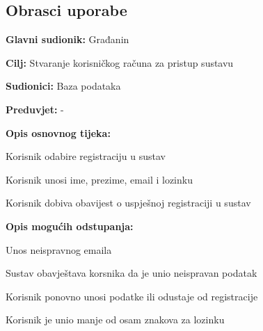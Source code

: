 			\eject 
			
			
				
			\subsection{Obrasci uporabe}
				
			
					

					\noindent {}
					\begin{packed_item}
	
						\item \textbf{Glavni sudionik: } Građanin
						\item  \textbf{Cilj:} Stvaranje korisničkog računa za pristup sustavu
						\item  \textbf{Sudionici:} Baza podataka
						\item  \textbf{Preduvjet:} -
						\item  \textbf{Opis osnovnog tijeka:}
						
						\item[] \begin{packed_enum}
	
							\item Korisnik odabire registraciju u sustav
							\item Korisnik unosi ime, prezime, email i lozinku
							\item Korisnik dobiva obavijest o uspješnoj registraciji u sustav
						\end{packed_enum}
						
						\item  \textbf{Opis mogućih odstupanja:}
						
						\item[] \begin{packed_item}
	
							\item[2.a] Unos neispravnog emaila
							
							\item[] \begin{packed_enum}
								
								\item Sustav obavještava korsnika da je unio neispravan podatak
								\item Korisnik ponovno unosi podatke ili odustaje od registracije
								
							\end{packed_enum}
							\item[2.b] Korisnik je unio manje od osam znakova za lozinku
							

\end{packed_item}
\end{packed_item}
